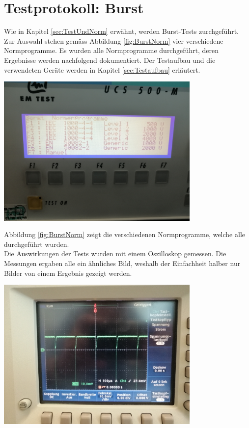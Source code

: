 \section{Testprotokoll: Burst}
\label{sec:Test:Burst}
Wie in Kapitel \ref{sec:TestUndNorm} erwähnt, werden Burst-Tests zurchgeführt. Zur Auswahl stehen gemäss Abbildung \ref{fig:BurstNorm} vier verschiedene Normprogramme. Es wurden alle Normprogramme durchgeführt, deren Ergebnisse werden nachfolgend dokumentiert. Der Testaufbau und die verwendeten Geräte werden in Kapitel \ref{sec:Testaufbau} erläutert.\\[0.5cm]
\begin{minipage}[b][10cm][t]{1\textwidth}
\centering
\includegraphics[angle=0,width=0.75\textwidth]{graphics/BurstNormprogramm.jpg}
\label{fig:BurstNorm}
\end{minipage}
Abbildung \ref{fig:BurstNorm} zeigt die verschiedenen Normprogramme, welche alle durchgeführt wurden.\\[0.25cm]
Die Auswirkungen der Tests wurden mit einem Oszilloskop gemessen. Die Messungen ergaben alle ein ähnliches Bild, weshalb der Einfachheit halber nur Bilder von einem Ergebnis gezeigt werden.\\[0.25cm]
\begin{minipage}[b][10cm][t]{1\textwidth}
\centering
\includegraphics[angle=0,width=0.75\textwidth]{graphics/BurstE1.jpg}
\label{fig:BurstE1}
\end{minipage}
